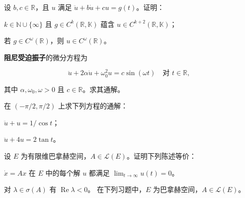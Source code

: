\begin{exercises}
设 $ b, c \in \mathbb{R} $，且 $ u $ 满足 $ \ddot{u} + b\dot{u} + cu = g(t) $。证明：

\begin{subitems}
\item

$ k \in \mathbb{N} \cup \{\infty\} $ 且 $ g \in C^{k}(\mathbb{R}, \mathbb{K}) $ 蕴含 $ u \in C^{k+2}(\mathbb{R}, \mathbb{K}) $；

\item

若 $ g \in C^{\omega}(\mathbb{R}) $，则 $ u \in C^{\omega}(\mathbb{R}) $。

\end{subitems}

\item

\textbf{阻尼受迫振子}的微分方程为

\[
\ddot{u} + 2\alpha\dot{u} + \omega_0^{2}u = c\sin(\omega t) \quad \text{对 } t \in \mathbb{R} ,
\]

其中 $ \alpha, \omega_0, \omega > 0 $ 且 $ c \in \mathbb{R} $。求其通解。

\item

在 $ (-\pi/2, \pi/2) $ 上求下列方程的通解：

\begin{subitems}
\item

$ \ddot{u} + u = 1/\cos t $；

\item

$ \ddot{u} + 4u = 2\tan t $。

\end{subitems}

\item

设 $ E $ 为有限维巴拿赫空间，$ A \in \mathcal{L}(E) $。证明下列陈述等价：

\begin{subitems}
\item

$ \dot{x} = Ax $ 在 $ E $ 中的每个解 $ u $ 都满足 $ \lim_{t \to \infty} u(t) = 0 $。

\item

对 $ \lambda \in \sigma(A) $ 有 $ \operatorname{Re}\lambda < 0 $。
在下列习题中，$ E $ 为巴拿赫空间，$ A \in \mathcal{L}(E) $。

\end{subitems}


\end{exercises}
